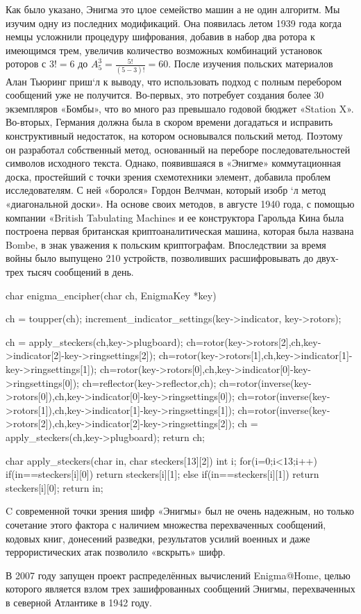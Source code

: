 Как было указано, Энигма это цлое семейство машин а не один 
алгоритм. Мы изучим одну из последних модификаций. Она появилась
летом 1939 года когда немцы усложнили процедуру шифрования, добавив 
в набор два ротора к имеющимся трем, увеличив количество возможных комбинаций 
установок роторов с $3! = 6$ до 
$A_5^3 = \frac{{5!}}{{\left( {5 - 3} \right)!}} = 60$. 
После изучения польских материалов Алан Тьюринг 
приш`л к выводу, что использовать подход с полным перебором сообщений 
уже не получится. Во-первых, это потребует создания более 30 
экземпляров «Бомбы», что во много раз превышало годовой бюджет 
«Station X». Во-вторых, Германия должна была в скором времени 
догадаться и исправить конструктивный недостаток, на котором 
основывался польский метод. Поэтому он разработал собственный 
метод, основанный на переборе последовательностей символов исходного 
текста. Однако, появившаяся в «Энигме» коммутационная доска, 
простейший с точки зрения схемотехники элемент, добавила проблем 
исследователям. С ней «боролся» Гордон Велчман, который изобр
`л метод «диагональной доски». На основе своих методов, в августе 
1940 года, с помощью компании «British Tabulating Machines
и ее конструктора Гарольда Кина была 
построена первая британская криптоаналитическая машина, которая 
была названа Bombe, в знак уважения к польским криптографам. 
Впоследствии за время войны было выпущено 210 устройств, позволивших 
расшифровывать до двух-трех тысяч сообщений в день.

\begin{listing}[1]
char enigma_encipher(char ch, EnigmaKey *key){
    ch = toupper(ch);
    increment_indicator_settings(key->indicator, key->rotors);

    ch = apply_steckers(ch,key->plugboard);
    ch=rotor(key->rotors[2],ch,key->indicator[2]-key->ringsettings[2]);  
    ch=rotor(key->rotors[1],ch,key->indicator[1]-key->ringsettings[1]);
    ch=rotor(key->rotors[0],ch,key->indicator[0]-key->ringsettings[0]);  
    ch=reflector(key->reflector,ch); 
    ch=rotor(inverse(key->rotors[0]),ch,key->indicator[0]-key->ringsettings[0]);  
    ch=rotor(inverse(key->rotors[1]),ch,key->indicator[1]-key->ringsettings[1]);   
    ch=rotor(inverse(key->rotors[2]),ch,key->indicator[2]-key->ringsettings[2]);   
    ch = apply_steckers(ch,key->plugboard);   
    return ch;
} 

char apply_steckers(char in, char steckers[13][2]){
    int i;
    for(i=0;i<13;i++){
        if(in==steckers[i][0]) return steckers[i][1];
        else if(in==steckers[i][1]) return steckers[i][0];
    }
    return in;
}
\end{listing}

C современной точки зрения шифр «Энигмы» был не очень надежным,
но только сочетание этого фактора с наличием множества перехваченных 
сообщений, кодовых книг, донесений разведки, результатов усилий 
военных и даже террористических атак позволило «вскрыть» шифр.

В 2007 году запущен проект распределённых вычислений Enigma@Home, 
целью которого является взлом трех зашифрованных сообщений Энигмы, 
перехваченных в северной Атлантике в 1942 году.
